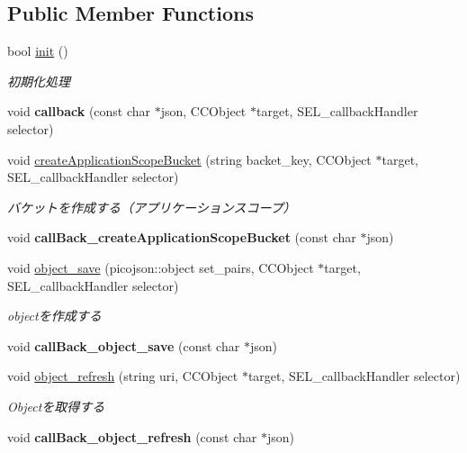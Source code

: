 \subsection*{Public Member Functions}
\begin{DoxyCompactItemize}
\item 
bool \hyperlink{class_c_kii_bucket_ae687c3b2a7e95b6e425303c9d944d35b}{init} ()
\begin{DoxyCompactList}\small\item\em 初期化処理 \end{DoxyCompactList}\item 
\hypertarget{class_c_kii_bucket_a1f4fd49239cd277c1861c83fcb5e098b}{void {\bfseries callback} (const char $\ast$json, C\-C\-Object $\ast$target, S\-E\-L\-\_\-callback\-Handler selector)}\label{class_c_kii_bucket_a1f4fd49239cd277c1861c83fcb5e098b}

\item 
void \hyperlink{class_c_kii_bucket_a66ba352bd451a254a871903e4f28502c}{create\-Application\-Scope\-Bucket} (string backet\-\_\-key, C\-C\-Object $\ast$target, S\-E\-L\-\_\-callback\-Handler selector)
\begin{DoxyCompactList}\small\item\em バケットを作成する（アプリケーションスコープ） \end{DoxyCompactList}\item 
\hypertarget{class_c_kii_bucket_a260a88c89b192ba5cf2c64b5a99d7dac}{void {\bfseries call\-Back\-\_\-create\-Application\-Scope\-Bucket} (const char $\ast$json)}\label{class_c_kii_bucket_a260a88c89b192ba5cf2c64b5a99d7dac}

\item 
void \hyperlink{class_c_kii_bucket_a5d70b7701c19ec9176c3ac744bcc2519}{object\-\_\-save} (picojson\-::object set\-\_\-pairs, C\-C\-Object $\ast$target, S\-E\-L\-\_\-callback\-Handler selector)
\begin{DoxyCompactList}\small\item\em objectを作成する \end{DoxyCompactList}\item 
\hypertarget{class_c_kii_bucket_a57b3dfbce914b0d8ef38145be32f79b3}{void {\bfseries call\-Back\-\_\-object\-\_\-save} (const char $\ast$json)}\label{class_c_kii_bucket_a57b3dfbce914b0d8ef38145be32f79b3}

\item 
void \hyperlink{class_c_kii_bucket_a04d59d67bce72418cbe2a11861b64e4f}{object\-\_\-refresh} (string uri, C\-C\-Object $\ast$target, S\-E\-L\-\_\-callback\-Handler selector)
\begin{DoxyCompactList}\small\item\em Objectを取得する \end{DoxyCompactList}\item 
\hypertarget{class_c_kii_bucket_ae5fd5045697030cdce7d004fb7e26bc4}{void {\bfseries call\-Back\-\_\-object\-\_\-refresh} (const char $\ast$json)}\label{class_c_kii_bucket_ae5fd5045697030cdce7d004fb7e26bc4}


\end{DoxyCompactItemize}
